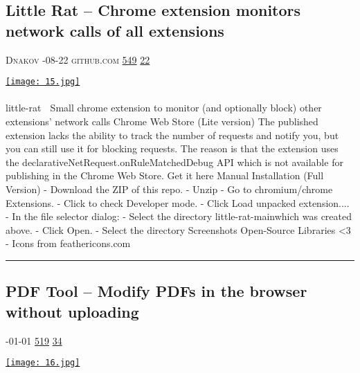 \documentclass[10pt,a4paper]{article}
\begin{document}
\begin{multicols}{2}
\begin{minipage}{\linewidth}
\subsection{Little Rat – Chrome extension monitors network calls of all extensions}
\textsc{\footnotesize
{\scriptsize\faUser}\space 
Dnakov 
{\scriptsize\faCalendar}-08-22 
{\scriptsize\faGithub}\space 
github.com 
{\scriptsize\faThumbsOUp}\space 
\href{http://news.ycombinator.com/item?id=37119942\&utm\_term=comment}{549} 
{\scriptsize\faComments}\space 
\href{http://news.ycombinator.com/item?id=37119942\&utm\_term=comment}{22} 
}
\par\medskip\noindent
\href{https://github.com/dnakov/little-rat?utm\_source=hackernewsletter\&utm\_medium=email\&utm\_term=show\_hn}{
    \texttt{[image: 15.jpg]}
}
\end{minipage}
\paragraph{}
little-rat
🐀 Small chrome extension to monitor (and optionally block) other extensions' network calls
Chrome Web Store (Lite version)
The published extension lacks the ability to track the number of requests and notify you, but you can still use it for blocking requests. The reason is that the extension uses the
declarativeNetRequest.onRuleMatchedDebug API which is not available for publishing in the Chrome Web Store.
Get it here
Manual Installation (Full Version)
- Download the ZIP of this repo.
- Unzip
- Go to chromium/chrome Extensions.
- Click to check Developer mode.
- Click Load unpacked extension....
- In the file selector dialog:
- Select the directory
little-rat-mainwhich was created above.
- Click Open.
- Select the directory
Screenshots
Open-Source Libraries <3
- Icons from feathericons.com
\par\noindent\textcolor{red}{\rule{\linewidth}{0.2mm}}
\vfill
\null
\noindent\begin{minipage}{\linewidth}
\subsection{PDF Tool – Modify PDFs in the browser without uploading}
\textsc{\footnotesize
{\scriptsize\faCalendar}-01-01 
{\scriptsize\faThumbsOUp}\space 
\href{http://news.ycombinator.com/item?id=37110628\&utm\_term=comment}{519} 
{\scriptsize\faComments}\space 
\href{http://news.ycombinator.com/item?id=37110628\&utm\_term=comment}{34} 
}
\par\medskip\noindent
\href{https://www.pdftool.org?utm\_source=hackernewsletter\&utm\_medium=email\&utm\_term=show\_hn}{
    \texttt{[image: 16.jpg]}
}
\end{minipage}

\end{multicols}
\end{document}
